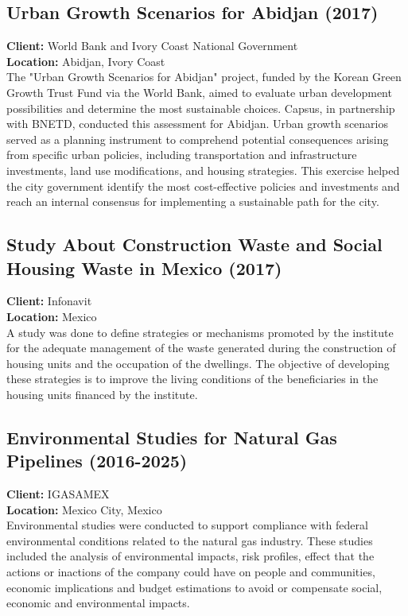 \documentclass[
	a4paper,
	12pt,
	unnumberedsections,
]{CSSullivanBusinessReport}
\begin{document}
\subsection{Urban Growth Scenarios for Abidjan (2017)}
\textbf{Client:}  World Bank and Ivory Coast National Government \\
\textbf{Location:}  Abidjan, Ivory Coast \\[0.5em]
  The "Urban Growth Scenarios for Abidjan" project, funded by the Korean Green Growth Trust Fund via the World Bank, aimed to evaluate urban development possibilities and determine the most sustainable choices. Capsus, in partnership with BNETD, conducted this assessment for Abidjan. Urban growth scenarios served as a planning instrument to comprehend potential consequences arising from specific urban policies, including transportation and infrastructure investments, land use modifications, and housing strategies. This exercise helped the city government identify the most cost-effective policies and investments and reach an internal consensus for implementing a sustainable path for the city.

\subsection{Study About Construction Waste and Social Housing Waste in Mexico (2017)}
\textbf{Client:}  Infonavit \\
\textbf{Location:}  Mexico \\[0.5em]
 A study was done to define strategies or mechanisms promoted by the institute for the adequate management of the waste generated during the construction of housing units and the occupation of the dwellings. The objective of developing these strategies is to improve the living conditions of the beneficiaries in the housing units financed by the institute.

\subsection{Environmental Studies for Natural Gas Pipelines (2016-2025)}
\textbf{Client:}  IGASAMEX \\
\textbf{Location:}  Mexico City, Mexico \\[0.5em]
 Environmental studies were conducted to support compliance with federal environmental conditions related to the natural gas industry. These studies included the analysis of environmental impacts, risk profiles, effect that the actions or inactions of the company could have on people and communities, economic implications and budget estimations to avoid or compensate social, economic and environmental impacts.
\end{document}
